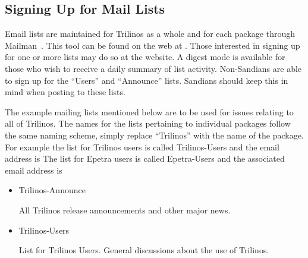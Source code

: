 \documentclass[12pt,relax]{TrilinosUserGuide}
\begin{document}
\subsection{Signing Up for Mail Lists}
\label{subsect:MailMan}
Email lists are maintained for Trilinos as a whole and for each package 
through Mailman~\cite{Mailman}.  This tool can be found on the web at 
\newline
{}.  
Those interested in signing 
up for one or more lists may do so at the website.  A digest mode is 
available for those who wish to receive a daily summary of list activity.  
Non-Sandians are able to sign up for the ``Users'' and ``Announce'' 
lists.  Sandians should keep this in mind when posting to these lists.

The example mailing lists mentioned below are to be used 
for issues relating to all of Trilinos.  The names for the lists pertaining to 
individual packages follow the same naming scheme, simply replace ``Trilinos'' 
with the name of the package.  For example the list for Trilinos users is 
called Trilinos-Users and the email address is 
  The list 
for Epetra users is called Epetra-Users and the associated email address is 


\begin{itemize}
\item Trilinos-Announce 

All Trilinos release announcements and other major news.

\item Trilinos-Users 

List for Trilinos Users.  General discussions about the use of Trilinos.
\end{itemize}
\end{document}
